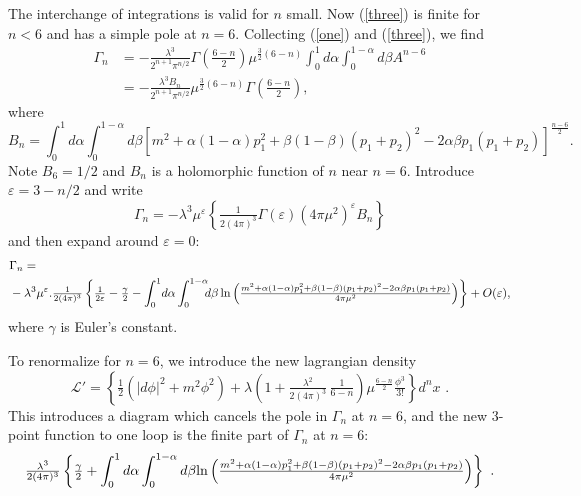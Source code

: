 \documentclass[12pt,leqno]{article}
\newcommand{\ScrL}{{\mathscr{L}}}
\theoremstyle{plain}
{\theorembodyfont{}\newtheorem{thm}{Theorem}}
\theoremstyle{remark}
{\theorembodyfont{\rmfamily} \newtheorem*{Rem}{\bf Remark}}
\newcommand{\Ln}{\text{\rm ln}}
\newcommand{\eps}{{\varepsilon}}
\newcommand{\lam}{{\lambda}}
\begin{document}
The interchange of integrations is valid for $n$ small.
Now (\ref{three}) is finite for $n<6$ and has a simple pole
at $n=6$.
Collecting (\ref{one}) and (\ref{three}), we find
\begin{equation*}
\begin{align*}
\Gamma_n
&=-\tfrac{\lam^3}{2^{n+1}\pi^{n/2}}\Gamma\left(\tfrac{6-n}{2}
\right)\mu^{\frac32(6-n)}\int_0^1 d\alpha\int_0^{1-\alpha}
d\beta A^{n-6}\\
&=-\tfrac{\lam^3
B_n}{2^{n+1}\pi^{n/2}}\mu^{\frac32(6-n)}\Gamma
\left(\tfrac{6-n}{2}\right),
\end{align*}
\end{equation*}
where
$$
B_n=\int_0^1 d\alpha\int_0^{1-\alpha}d\beta
\left[m^2+\alpha(1-\alpha)p_1^2+\beta(1-\beta)(p_1+p_2)^2-2\alpha
\beta p_1(p_1+p_2)\right]^{\frac{n-6}{2}}.
$$
Note $B_6=1/2$ and $B_n$ is a holomorphic function of $n$
near $n=6$.
Introduce $\eps=3-n/2$ and write
$$
\Gamma_n=-\lam^3\mu^\eps\left\{\tfrac{1}{2(4\pi)^3}
\Gamma(\eps)(4\pi\mu^2)^\eps B_n\right\}
$$
and then expand around $\eps=0$:
\begin{equation*}
\begin{align*}
&\Gamma_n=\\
&-\lam^3\mu^\eps.\tfrac{1}{2(4\pi)^3}\left\{
  \tfrac{1}{2\eps}-\tfrac{\gamma}{2}-\int_0^1\! d\alpha
  \int_0^{1-\alpha}\!\!\! d\beta\,\Ln
\left(\tfrac{m^2+\alpha(1-\alpha)p_1^2+\beta(1-\beta)(p_1+p_2)^2
-2\alpha\beta
p_1(p_1+p_2)}{4\pi\mu^2}\right)\right\}+O(\eps),
\end{align*}
\end{equation*}
where $\gamma$ is Euler's constant.

To renormalize for $n=6$, we introduce the new lagrangian
density
$$
\ScrL'=\left\{\tfrac12\left(\vert d\phi\vert^2+m^2\phi^2\right)+
\lam\left(1+\tfrac{\lam^2}{2(4\pi)^3}\,\tfrac{1}{6-n}\right)
\mu^{\frac{6-n}{2}}\tfrac{\phi^3}{3!}\right\}d^nx\,\,.
$$
This introduces a diagram which cancels the pole in
$\Gamma_n$ at $n=6$, and the new $3$-point function to one
loop is the finite part of $\Gamma_n$ at $n=6$:
$$
\tfrac{\lam^3}{2(4\pi)^3}\left\{\tfrac{\gamma}{2}+\int_0^1
 d\alpha \int_0^{1-\alpha}d\beta\Ln\left(
\tfrac{m^2+\alpha(1-\alpha)p_1^2+\beta(1-\beta)(p_1+p_2)^2-2
  \alpha\beta p_1(p_1+p_2)}{4\pi\mu^2}\right)\right\}\,\,.
$$
\end{document}
